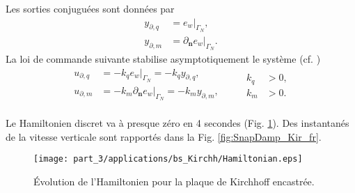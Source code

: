 Les sorties conjuguées sont données par
\begin{equation*}
\begin{aligned}
y_{\partial, q} &= e_w|_{\Gamma_N}, \\
y_{\partial, m} &=\partial_{\bm{n}} e_w|_{\Gamma_N}.
\end{aligned}
\end{equation*}
La loi de commande suivante stabilise asymptotiquement le système (cf. \cite{lagnese1989})
\begin{equation*}
\begin{aligned}
u_{\partial, q} &= - k_q e_w|_{\Gamma_N} = - k_q y_{\partial, q}, \\
u_{\partial, m} &= - k_m \partial_{\bm{n}} e_w|_{\Gamma_N}  = - k_m y_{\partial, m}, \\
\end{aligned} \qquad
\begin{aligned}
k_q&>0, \\
k_m&>0.
\end{aligned}
\end{equation*}

Le Hamiltonien discret va à presque zéro en 4 secondes (Fig. \ref{fig:H_bs_Kirchhoff_fr}). Des instantanés de la vitesse verticale sont rapportés dans la Fig. \ref{fig:SnapDamp_Kir_fr}.

\begin{figure}[htb]
	\centering
	\texttt{[image: part\_3/applications/bs\_Kirchh/Hamiltonian.eps]}
	\caption{Évolution de l'Hamiltonien pour la plaque de Kirchhoff encastrée.}
	\label{fig:H_bs_Kirchhoff_fr}
\end{figure}

\begin{figure*}[p]
	\centering
	\hfil
	\hfil
	\hfil
	\hfil
	\caption{Instantanés à différents moments de la simulation de la plaque de Kirchhoff contrôlée au bord.}
	\label{fig:SnapDamp_Kir_fr}
	\hfil
\end{figure*}

